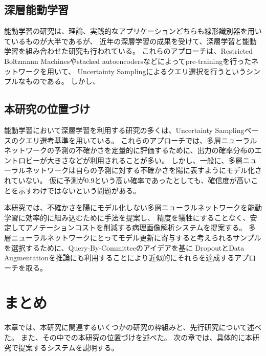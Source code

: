 \subsection{深層能動学習}
能動学習の研究は、理論、実践的なアプリケーションどちらも線形識別器を用いているものが大半であるが、
近年の深層学習の成果を受けて、深層学習と能動学習を組み合わせた研究も行われている\cite{6889457, li2016active}。
これらのアプローチは、Restricted Boltzmann Machinesやstacked autoencodersなどによってpre-trainingを行ったネットワークを用いて、
Uncertainty Samplingによるクエリ選択を行うというシンプルなものである。
しかし、

\subsection{本研究の位置づけ}
能動学習において深層学習を利用する研究の多くは、Uncertainty Samplingベースのクエリ選考基準を用いている。
これらのアプローチでは、多層ニューラルネットワークの予測の不確かさを定量的に評価するために、出力の確率分布のエントロピーが大きさなどが利用されることが多い。
しかし、一般に、多層ニューラルネットワークは自らの予測に対する不確かさを陽に表すようにモデル化されていない。
仮に予測が0.9という高い確率であったとしても、確信度が高いことを示すわけではないという問題がある。

本研究では、不確かさを陽にモデル化しない多層ニューラルネットワークを能動学習に効率的に組み込むために手法を提案し、
精度を犠牲にすることなく、安定してアノテーションコストを削減する病理画像解析システムを提案する。
多層ニューラルネットワークにとってモデル更新に寄与すると考えられるサンプルを選択するために、Query-By-Committeeのアイデアを基に
DropoutとData Augmentationを推論にも利用することにより近似的にそれらを達成するアプローチを取る。

\section{まとめ}
本章では、本研究に関連するいくつかの研究の枠組みと、先行研究について述べた。
また、その中での本研究の位置づけを述べた。
次の章では、具体的に本研究で提案するシステムを説明する。